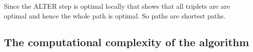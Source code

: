 Since the ALTER step is optimal locally that shows that all triplets are are optimal and hence the whole path is optimal. So paths are shortest paths.



\subsection{The computational complexity of the algorithm}





